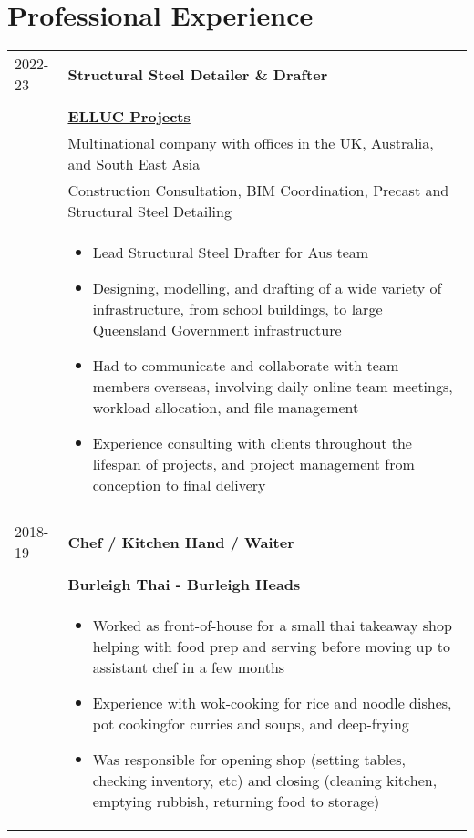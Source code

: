 \documentclass[10pt]{article}
\begin{document}
\section*{Professional Experience}
\begin{tabular}{ p{2cm}|p{15cm} }
    2022-23 & \Large\textbf{Structural Steel Detailer \& Drafter} \\ \\
    & \href{https://www.linkedin.com/company/ellucprojects/?originalSubdomain=uk}{\large\textbf{ELLUC Projects}} \\
    & Multinational company with offices in the UK, Australia, and South East Asia \\
    & Construction Consultation, BIM Coordination, Precast and Structural Steel Detailing \\
    & \begin{itemize}
        \setlength\itemsep{0pt} 
        \item Lead Structural Steel Drafter for Aus team
        \item Designing, modelling, and drafting of a wide variety of infrastructure, from school buildings, to large Queensland Government infrastructure
        \item Had to communicate and collaborate with team members overseas, involving daily online team meetings, workload allocation, and file management
        \item Experience consulting with clients throughout the lifespan of projects, and project management from conception to final delivery
    \end{itemize} \\ \\
    2018-19 & \Large\textbf{Chef / Kitchen Hand / Waiter} \\ \\ 
    & \large\textbf{Burleigh Thai - Burleigh Heads} \\
    & \begin{itemize}
        \setlength\itemsep{0pt}
        \item Worked as front-of-house for a small thai takeaway shop helping with food prep and serving before moving up to assistant chef in a few months
        \item Experience with wok-cooking for rice and noodle dishes, pot cookingfor curries and soups, and deep-frying
        \item Was responsible for opening shop (setting tables, checking inventory, etc) and closing (cleaning kitchen, emptying rubbish, returning food to storage)

\end{itemize}
\end{tabular}
\end{document}
